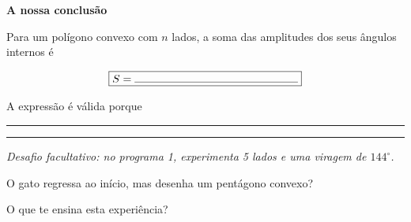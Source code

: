 
\begin{conclusao}

\textbf{A nossa conclusão}

Para um polígono convexo com $n$ lados,
a soma das amplitudes dos seus ângulos
internos é

\[
\boxed{S=\rule{5.2cm}{.35pt}}
\]

A expressão é válida porque
\rule{8.8cm}{.35pt}

\vspace{5pt}

\rule{\linewidth}{.35pt}

\end{conclusao}

\vspace{1mm}

{\footnotesize\itshape
Desafio facultativo:
no programa 1, experimenta 5 lados
e uma viragem de $144^\circ$.

O gato regressa ao início,
mas desenha um pentágono convexo?

O que te ensina esta experiência?
}
